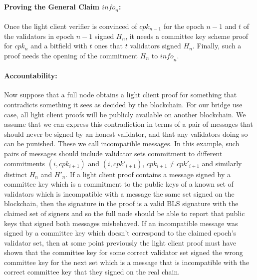 \noindent\paragraph{Proving the General Claim $\mathit{info}_n$:} Once the light client verifier is convinced of $cpk_{n-1}$ for the epoch $n-1$ and $t$ of the validators in epoch $n-1$ signed $H_n$, it needs a committee key scheme proof for $cpk_n$ and a bitfield with $t$ ones that $t$ validators signed $H_n$. Finally, such a proof needs the opening of the commitment $H_n$ to $\mathit{info}_n$.
\vspace{-0.08in}

\noindent\paragraph{Accountability:} Now suppose that a full node obtains a light client proof for something that contradicts something it sees as decided by the blockchain. For our bridge use case, all light client proofs will be publicly available on another blockchain. We assume that we can express this contradiction in terms of a pair of messages that should never be signed by an honest validator, and that any validators doing so can be punished. These we call incompatible messages. In this example, such pairs of messages should include validator sets commitment to different commitments $(i,cpk_{i+1})$ and $(i,cpk'_{i+1})$, $cpk_{i+1} \neq cpk'_{i+1}$ and similarly distinct $H_n$ and $H'_n$. If a light client proof contains a message signed by a committee key which is a commitment to the public keys of a known set of validators which is incompatible with a message the same set signed on the blockchain, then the signature in the proof is a valid BLS signature with the claimed set of signers and so the full node should be able to report that public keys that signed both messages misbehaved. If an incompatible message was signed by a committee key which doesn't correspond to the claimed epoch's validator set, then at some point previously the light client proof must have shown that the committee key for some correct validator set signed the wrong committee key for the next set which is a message that is incompatible with the correct committee key that they signed on the real chain.
\vspace{-0.05in}

